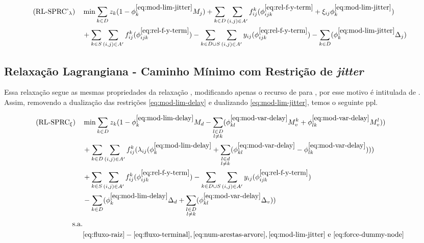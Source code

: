\begin{align}
(\text{RL-SPRC'}_{\lambda}) \quad
    & \nonumber \displaystyle \min \sum_{k \in D}z_k (1 - \phi^{\ref{eq:mod-lim-jitter}}_{k}M_j) + \sum_{k \in D} \sum_{(i, j) \in A'} f_{ij}^{k} (\phi^{\ref{eq:rel-f-y-term}}_{ijk} + \xi_{ij} \phi^{\ref{eq:mod-lim-jitter}}_{k}) & \\
   & \displaystyle + \sum_{k \in S} \sum_{(i, j) \in A'} f_{ij}^{k}(\phi^{\ref{eq:rel-f-y-term}}_{ijk}) - \sum_{k \in D \cup S} \sum_{(i, j) \in A'} y_{ij}(\phi^{\ref{eq:rel-f-y-term}}_{ijk}) - \sum_{k \in D} (\phi^{\ref{eq:mod-lim-jitter}}_{k} \Delta_j) & \label{eq:fo-sprc-delay-weaker} 
\end{align}

\subsection{Relaxação Lagrangiana - Caminho Mínimo com Restrição de {\em jitter}} \label{subsec:rl-sprc-jitter}

Essa relaxação  segue as  mesmas propriedades  da relaxação  {\rld}, modificando
apenas o  recurso de {\delay}  para {\jitter}, por  esse motivo é  intitulada de
{\rlt}. Assim, removendo a  dualização das restrições \eqref{eq:mod-lim-delay} e
dualizando \eqref{eq:mod-lim-jitter}, temos o seguinte \gls{ppl}.

\begin{align}
(\text{RL-SPRC}_{\xi}) \quad 
  & \nonumber \displaystyle \min \sum_{k \in D}z_k (1 - \phi^{\ref{eq:mod-lim-delay}}_{k}M_d - \sum_{\substack{l \in D \\ l \neq k}}(\phi^{\ref{eq:mod-var-delay}}_{kl}M_v^k + \phi^{\ref{eq:mod-var-delay}}_{lk}M_v^l)) & \\ 
  & \nonumber \displaystyle + \sum_{k \in D} \sum_{(i, j) \in A'} f_{ij}^{k} (\lambda_{ij} (\phi^{\ref{eq:mod-lim-delay}}_{k} + \sum_{\substack{l \in d \\ l \neq k}} (\phi^{\ref{eq:mod-var-delay}}_{kl} - \phi^{\ref{eq:mod-var-delay}}_{lk}) ) ) & \\
  & \nonumber \displaystyle + \sum_{k \in S} \sum_{(i, j) \in A'} f_{ij}^{k}(\phi^{\ref{eq:rel-f-y-term}}_{ijk}) - \sum_{k \in D \cup S} \sum_{(i, j) \in A'} y_{ij}(\phi^{\ref{eq:rel-f-y-term}}_{ijk}) & \\
  & \displaystyle - \sum_{k \in D} (\phi^{\ref{eq:mod-lim-delay}}_{k} \Delta_d + \sum_{\substack{l \in D \\ l \neq k}}(\phi^{\ref{eq:mod-var-delay}}_{kl} \Delta_v)) & \label{eq:fo-sprc-jitter} \\
\nonumber \text{s.a.} \\ \quad
    & \nonumber \eqref{eq:fluxo-raiz}-\eqref{eq:fluxo-terminal}, \eqref{eq:num-arestas-arvore}, \eqref{eq:mod-lim-jitter} \text{ e } \eqref{eq:force-dummy-node} & 
\end{align}

